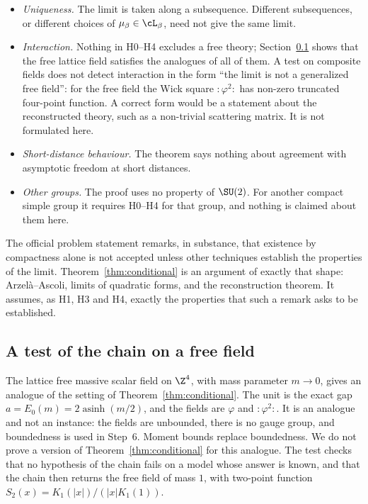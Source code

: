 \begin{itemize}
\item \emph{Uniqueness.} The limit is taken along a subsequence. Different subsequences, or different choices of $\mu_\beta\in\cL_\beta$, need not give the same limit.
\item \emph{Interaction.} Nothing in H0--H4 excludes a free theory; Section~\ref{red:free} shows that the free lattice field satisfies the analogues of all of them. A test on composite fields does not detect interaction in the form ``the limit is not a generalized free field'': for the free field the Wick square $:\!\varphi^2\!:$ has non-zero truncated four-point function. A correct form would be a statement about the reconstructed theory, such as a non-trivial scattering matrix. It is not formulated here.
\item \emph{Short-distance behaviour.} The theorem says nothing about agreement with asymptotic freedom at short distances.
\item \emph{Other groups.} The proof uses no property of $\SU(2)$. For another compact simple group it requires H0--H4 for that group, and nothing is claimed about them here.
\end{itemize}
The official problem statement \cite{JW} remarks, in substance, that existence by compactness alone is not accepted unless other techniques establish the properties of the limit. Theorem~\ref{thm:conditional} is an argument of exactly that shape: Arzel\`a--Ascoli, limits of quadratic forms, and the reconstruction theorem. It assumes, as H1, H3 and H4, exactly the properties that such a remark asks to be established.

\subsection{A test of the chain on a free field}\label{red:free}

The lattice free massive scalar field on $\Z^4$, with mass parameter $m\to0$, gives an analogue of the setting of Theorem~\ref{thm:conditional}. The unit is the exact gap $a=E_0(m)=2\operatorname{asinh}(m/2)$, and the fields are $\varphi$ and $:\!\varphi^2\!:$. It is an analogue and not an instance: the fields are unbounded, there is no gauge group, and boundedness is used in Step~6. Moment bounds replace boundedness. We do not prove a version of Theorem~\ref{thm:conditional} for this analogue. The test checks that no hypothesis of the chain fails on a model whose answer is known, and that the chain then returns the free field of mass $1$, with two-point function $S_2(x)=K_1(|x|)/(|x|K_1(1))$.

